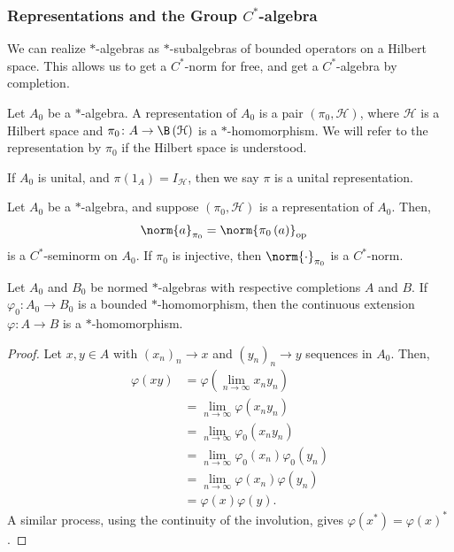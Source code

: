 \documentclass[10pt]{mypackage}
\begin{document}
\subsubsection{Representations and the Group $C^{\ast}$-algebra}%
We can realize $\ast$-algebras as $\ast$-subalgebras of bounded operators on a Hilbert space. This allows us to get a $C^{\ast}$-norm for free, and get a $C^{\ast}$-algebra by completion.
\begin{definition}
  Let $A_0$ be a $\ast$-algebra. A representation of $A_0$ is a pair $\left(\pi_0,\mathcal{H}\right)$, where $\mathcal{H}$ is a Hilbert space and $\pi_0\colon A\rightarrow \B\left(\mathcal{H}\right)$ is a $\ast$-homomorphism. We will refer to the representation by $\pi_0$ if the Hilbert space is understood.\newline

  If $A_0$ is unital, and $\pi\left(1_A\right) = I_{\mathcal{H}}$, then we say $\pi$ is a unital representation.
\end{definition}
\begin{lemma}
  Let $A_0$ be a $\ast$-algebra, and suppose $\left(\pi_0,\mathcal{H}\right)$ is a representation of $A_0$. Then,
  \begin{align*}
    \norm{a}_{\pi_0} &= \norm{\pi_0\left(a\right)}_{\text{op}}
  \end{align*}
  is a $C^{\ast}$-seminorm on $A_0$. If $\pi_0$ is injective, then $\norm{\cdot}_{\pi_0}$ is a $C^{\ast}$-norm.
\end{lemma}
\begin{lemma}
  Let $A_0$ and $B_0$ be normed $\ast$-algebras with respective completions $A$ and $B$. If $\varphi_0\colon A_0\rightarrow B_0$ is a bounded $\ast$-homomorphism, then the continuous extension $\varphi\colon A\rightarrow B$ is a $\ast$-homomorphism.
\end{lemma}
\begin{proof}
  Let $x,y\in A$ with $\left(x_n\right)_n\rightarrow x$ and $\left(y_n\right)_n\rightarrow y$ sequences in $A_0$. Then,
  \begin{align*}
    \varphi\left(xy\right) &= \varphi\left(\lim_{n\rightarrow\infty}x_ny_n\right)\\
                           &= \lim_{n\rightarrow\infty}\varphi\left(x_ny_n\right)\\
                           &= \lim_{n\rightarrow\infty}\varphi_0\left(x_ny_n\right)\\
                           &= \lim_{n\rightarrow\infty}\varphi_0\left(x_n\right)\varphi_0\left(y_n\right)\\
                           &= \lim_{n\rightarrow\infty}\varphi\left(x_n\right)\varphi\left(y_n\right)\\
                           &= \varphi\left(x\right)\varphi\left(y\right).
  \end{align*}
  A similar process, using the continuity of the involution, gives $\varphi\left(x^{\ast}\right) = \varphi\left(x\right)^{\ast}$.
\end{proof}
\end{document}
